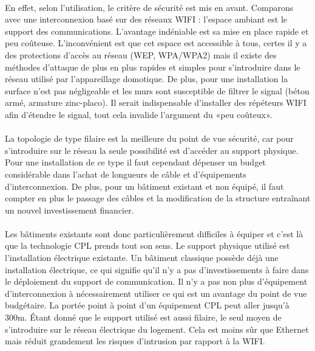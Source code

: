     \paragraph{}
En effet, selon l’utilisation, le critère de sécurité est mis en avant.
Comparons avec une interconnexion basé sur des réseaux WIFI : l’espace ambiant est le support des communications.
L’avantage indéniable est sa mise en place rapide et peu coûteuse.
L’inconvénient est que cet espace est accessible à tous, certes il y a des protections d'accès au réseau (WEP, WPA/WPA2)
mais il existe des méthodes d’attaque de plus en plus rapides et simples pour s’introduire dans le réseau utilisé par l’appareillage domotique.
De plus, pour une installation la surface n'est pas négligeable et les murs sont susceptible de filtrer le signal (béton armé, armature zinc-placo).
Il serait indispensable d’installer des répéteurs WIFI afin d’étendre le signal, tout cela invalide l’argument du «peu coûteux».
    \paragraph{}
La topologie de type filaire est la meilleure du point de vue sécurité, car pour s'introduire sur le réseau la seule possibilité est d’accéder au support physique.
Pour une installation de ce type il faut cependant dépenser un budget considérable dans l’achat de longueurs de câble et d'équipements d’interconnexion.
De plus, pour un bâtiment existant et non équipé, il faut compter en plus le passage des câbles et la modification de la structure entraînant un nouvel investissement financier.
    \paragraph{}
Les bâtiments existants sont donc particulièrement difficiles à équiper et c’est là que la technologie CPL prends tout son sens.
Le support physique utilisé est l’installation électrique existante.
Un bâtiment classique possède déjà une installation électrique, ce qui signifie qu'il n'y a pas d’investissements à faire dans le déploiement du support de communication.
Il n’y a pas non plus d’équipement d’interconnexion à nécessairement utiliser ce qui est un avantage du point de vue budgétaire.
La portée point à point d’un équipement CPL peut aller jusqu’à 300m.
Étant donné que le support utilisé est aussi filaire, le seul moyen de s’introduire sur le réseau électrique du logement.
Cela est moins sûr que Ethernet mais réduit grandement les risques d’intrusion par rapport à la WIFI.


